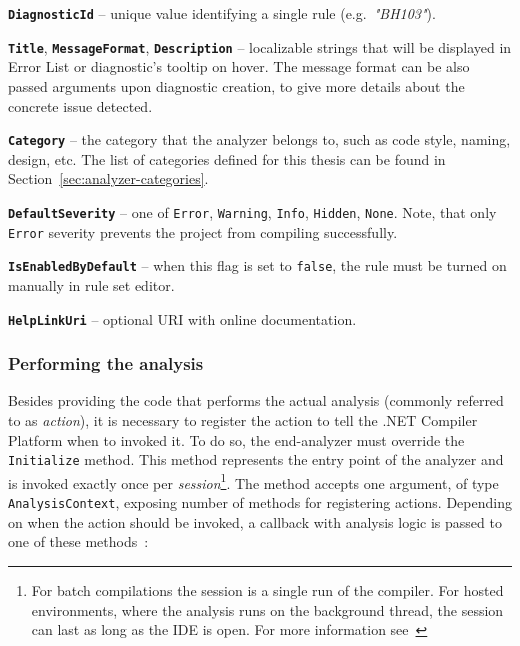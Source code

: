 \documentclass[
  digital, %
  table,   %
  lof,     %
  lot,     %
  oneside,
]{fithesis3}
\begin{document}
\smallskip
\begin{compactitem}
  \item[\texttt{\textbf{DiagnosticId}}] -- unique value identifying a single rule (e.g.~\textit{"BH103"}).
  \item[\texttt{\textbf{Title}}, \texttt{\textbf{MessageFormat}}, \texttt{\textbf{Description}}] -- localizable strings that will be displayed in Error List or diagnostic's tooltip on hover. The message format can be also passed arguments upon diagnostic creation, to give more details about the concrete issue detected.
  \item[\texttt{\textbf{Category}}] -- the category that the analyzer belongs to, such as code style, naming, design, etc. The list of categories defined for this thesis can be found in Section~\ref{sec:analyzer-categories}.
  \item[\texttt{\textbf{DefaultSeverity}}] -- one of \texttt{Error}, \texttt{Warning}, \texttt{Info}, \texttt{Hidden}, \texttt{None}. Note, that only \texttt{Error} severity prevents the project from compiling successfully.
  \item[\texttt{\textbf{IsEnabledByDefault}}] -- when this flag is set to \texttt{false}, the rule must be turned on manually in rule set editor.
  \item[\texttt{\textbf{HelpLinkUri}}] -- optional URI with online documentation.
\end{compactitem}

\subsubsection{\textbf{Performing the analysis}}
Besides providing the code that performs the actual analysis (commonly referred to as \textit{action}), it is necessary to register the action to tell the .NET Compiler Platform when to invoked it. To do so, the end-analyzer must override the \texttt{Initialize} method. This method represents the entry point of the analyzer and is invoked exactly once per \textit{session}\footnote{For batch compilations the session is a single run of the compiler. For hosted environments, where the analysis runs on the background thread, the session can last as long as the IDE is open. For more information see~\cite{analyzer-action-semantics}}. The method accepts one argument, of type \texttt{AnalysisContext}, exposing number of methods for registering actions. Depending on when the action should be invoked, a callback with analysis logic is passed to one of these methods~\cite{analyzer-action-semantics}:
\end{document}
